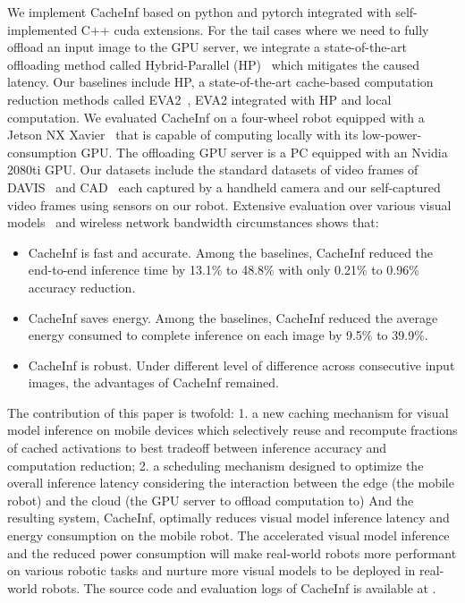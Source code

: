 We implement CacheInf based on python and pytorch integrated with self-implemented C++ cuda extensions.
For the tail cases where we need to fully offload an input image to the GPU server, we integrate a state-of-the-art offloading method called Hybrid-Parallel (HP)~\cite{sun2024hybridparallel} which mitigates the caused latency.
Our baselines include HP, a state-of-the-art cache-based computation reduction methods called EVA2~\cite{buckler_eva_2018}, EVA2 integrated with HP and local computation.
We evaluated CacheInf on a four-wheel robot equipped with a Jetson NX Xavier~\cite{jetsonnx} that is capable of computing locally with its low-power-consumption GPU.
The offloading GPU server is a PC equipped with an Nvidia 2080ti GPU.
Our datasets include the standard datasets of video frames of DAVIS~\cite{Perazzi2016} and CAD~\cite{Choi_VSWS_2009} each captured by a handheld camera and our self-captured video frames using sensors on our robot.
Extensive evaluation over various visual models~\cite{kapao,agrnav,noauthor_torchvision_nodate} and wireless network bandwidth circumstances shows that:
\begin{itemize}
    \item CacheInf is fast and accurate. Among the baselines, CacheInf reduced the end-to-end inference time by 13.1\% to 48.8\% with only 0.21\% to 0.96\% accuracy reduction.
    \item CacheInf saves energy. Among the baselines, CacheInf reduced the average energy consumed to complete inference on each image by 9.5\% to 39.9\%.
    \item CacheInf is robust. Under different level of difference across consecutive input images, the advantages of CacheInf remained.
\end{itemize}

The contribution of this paper is twofold: 1. a new caching mechanism for visual model inference on mobile devices which selectively reuse and recompute fractions of cached activations to best tradeoff between inference accuracy and computation reduction; 2. a scheduling mechanism designed to optimize the overall inference latency considering the interaction between the edge (the mobile robot) and the cloud (the GPU server to offload computation to)
And the resulting system, CacheInf, optimally reduces visual model inference latency and energy consumption on the mobile robot.
The accelerated visual model inference and the reduced power consumption will make real-world robots more performant on various robotic tasks and nurture more visual models to be deployed in real-world robots.
The source code and evaluation logs of CacheInf is available at .

